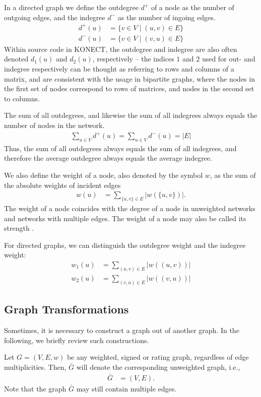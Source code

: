 \documentclass{article}
\begin{document}
In a directed graph we define the outdegree $d^+$ of a node as the number of
outgoing edges, and the indegree $d^-$ as the number of ingoing edges.
\begin{align}
  d^+(u) &= \{ v \in V \mid (u,v) \in E \} \\
  d^-(u) &= \{ v \in V \mid (v,u) \in E \}
\end{align}
Within source code in KONECT, the outdegree and indegree are also often denoted $d_1(u)$ and
$d_2(u)$, respectively -- the indices $1$ and $2$ used for out-
and indegree respectively can be thought as referring to rows and
columns of a matrix, and are consistent with the usage in bipartite
graphs, where the nodes in the first set of nodes correspond to rows of
matrices, and nodes in the second set to columns. 

The sum of all outdegrees, and likewise the sum of all indegrees always
equals the number of nodes in the network.  
\begin{align}
  \sum_{u\in V} d^+(u) = \sum_{u \in V} d^-(u) = |E|
\end{align}
Thus, the sum of all outdegrees always equals the sum of all indegrees,
and therefore the average outdegree always equals the average indegree.  

We also define the weight of a node, also denoted by the symbol $w$, as
the sum of the absolute weights of incident edges
\begin{align}
  w(u) &= \sum_{ \{u,v\} \in E} |w(\{u,v\})|. 
\end{align}
The weight of a node coincides with the degree of a node in unweighted
networks and networks with multiple edges. 
The weight of a node may also be called its strength \citep{b792}. 

For directed graphs, we can distinguish the outdegree weight and the
indegree weight:
\begin{align}
  w_1(u) &= \sum_{(u,v)\in E} |w((u,v))| \\
  w_2(u) &= \sum_{(v,u)\in E} |w((v,u))| 
\end{align}

\subsection{Graph Transformations}
Sometimes, it is necessary to construct a graph out of another graph.
In the following, we briefly review such constructions.  

Let $G=(V,E,w)$ be any weighted, signed or rating graph, regardless of
edge multiplicities.  Then, $\bar G$ will denote the corresponding
unweighted graph, i.e.,
\begin{align}
  \bar G &= (V,E).
\end{align}
Note that the graph $\bar G$ may still contain multiple edges. 
\end{document}
